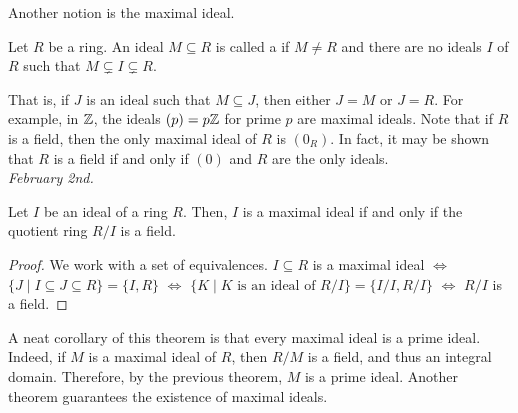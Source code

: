 Another notion is the maximal ideal.

\begin{definition}
    Let $R$ be a ring. An ideal $M \subseteq R$ is called a  if $M \neq R$ and there are no ideals $I$ of $R$ such that $M \subsetneq I \subsetneq R$.
\end{definition}

That is, if $J$ is an ideal such that $M \subseteq J$, then either $J = M$ or $J = R$. For example, in $\mathbb{Z}$, the ideals $(p) = p\mathbb{Z}$ for prime $p$ are maximal ideals. Note that if $R$ is a field, then the only maximal ideal of $R$ is $(0_{R})$. In fact, it may be shown that $R$ is a field if and only if $(0)$ and $R$ are the only ideals.\\

\textit{February 2nd.}
\begin{theorem}
    Let $I$ be an ideal of a ring $R$. Then, $I$ is a maximal ideal if and only if the quotient ring $R/I$ is a field.
\end{theorem}
\begin{proof}
    We work with a set of equivalences. $I \subseteq R$ is a maximal ideal \(\iff\) $\{J \mid I \subseteq J \subseteq R\} = \{I, R\}$ \(\iff\) $\{K \mid K \text{ is an ideal of } R/I\} = \{I/I, R/I\}$ \(\iff\) $R/I$ is a field.
\end{proof}

A neat corollary of this theorem is that every maximal ideal is a prime ideal. Indeed, if $M$ is a maximal ideal of $R$, then $R/M$ is a field, and thus an integral domain. Therefore, by the previous theorem, $M$ is a prime ideal. Another theorem guarantees the existence of maximal ideals.


